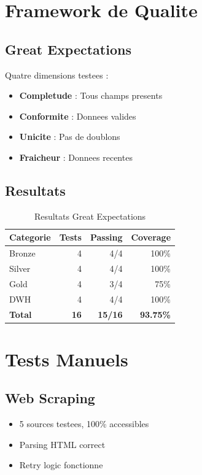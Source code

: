 \documentclass[12pt,a4paper]{report}
\newcommand{\checkmark}{\ding{51}}
\begin{document}
\section{Framework de Qualite}

\subsection{Great Expectations}

Quatre dimensions testees :

\begin{itemize}
    \item \textbf{Completude} : Tous champs presents
    \item \textbf{Conformite} : Donnees valides
    \item \textbf{Unicite} : Pas de doublons
    \item \textbf{Fraicheur} : Donnees recentes
\end{itemize}

\subsection{Resultats}

\begin{table}[H]
\centering
\begin{tabular}{lrrr}
\toprule
\textbf{Categorie} & \textbf{Tests} & \textbf{Passing} & \textbf{Coverage} \\
\midrule
Bronze & 4 & 4/4 & 100\% \\
Silver & 4 & 4/4 & 100\% \\
Gold & 4 & 3/4 & 75\% \\
DWH & 4 & 4/4 & 100\% \\
\midrule
\textbf{Total} & \textbf{16} & \textbf{15/16} & \textbf{93.75\%} \\
\bottomrule
\end{tabular}
\caption{Resultats Great Expectations}
\end{table}

\section{Tests Manuels}

\subsection{Web Scraping}

\begin{itemize}
    \item[\checkmark] 5 sources testees, 100\% accessibles
    \item[\checkmark] Parsing HTML correct
    \item[\checkmark] Retry logic fonctionne
\end{itemize}
\end{document}
